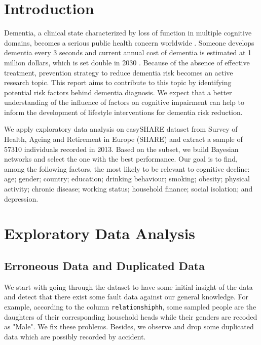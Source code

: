 \documentclass[11pt,twoside]{article}
\numberwithin{Theorem}{section}
\numberwithin{Definition}{section}
\numberwithin{Lemma}{section}
\numberwithin{Algorithm}{section}
\numberwithin{equation}{section}
\begin{document}
\tableofcontents

\setcounter{page}{1}

\nocite{*}

\clearpage

\section{Introduction}
\label{sec:intro}

Dementia, a clinical state characterized by loss of function in multiple cognitive domains, becomes a serious public health concern worldwide \cite{seixas2014bayesian}. Someone develops dementia every 3 seconds and current annual cost of dementia is estimated at 1 million dollars, which is set double in 2030 \cite{alzheimer2019world}. Because of the absence of effective treatment, prevention strategy to reduce dementia risk becomes an active research topic. This report aims to contribute to this topic by identifying potential risk factors behind dementia diagnosis. We expect that a better understanding of the influence of factors on cognitive impairment can help to inform the development of lifestyle interventions for dementia risk reduction. 

We apply exploratory data analysis on easySHARE dataset from Survey of Health, Ageing and Retirement in Europe (SHARE) and extract a sample of 57310 individuals recorded in 2013. Based on the subset, we build Bayesian networks and select the one with the best performance. Our goal is to find, among the following factors, the most likely to be relevant to cognitive decline: age; gender; country; education; drinking behaviour; smoking; obesity; physical activity; chronic disease; working status; household finance; social isolation; and depression. 

\clearpage

\section{Exploratory Data Analysis}  
\label{sec: EDA}

\subsection{Erroneous Data and Duplicated Data}

We start with going through the dataset to have some initial insight of the data and detect that there exist some fault data against our general knowledge. For example, according to the column \texttt{relationshiphh}, some sampled people are the daughters of their corresponding household heads while their genders are recoded as "Male". We fix these problems. Besides, we observe and drop some duplicated data which are possibly recorded by accident. 
\end{document}
